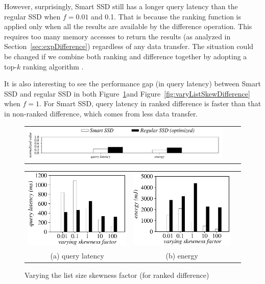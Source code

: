 However, surprisingly, Smart SSD still has a longer query latency than the regular SSD when $f=0.01$ and 0.1.
That is because the ranking function is applied only when all the results are available by the \textsf{difference} operation.
This requires too many memory accesses to return the results (as analyzed in Section~\ref{sec:expDifference}) regardless of any data transfer. The situation could be changed if we combine both ranking and difference together by adopting a top-$k$ ranking algorithm \cite{Fagin2001, Broder2003EQE}.

It is also interesting to see the performance gap (in query latency) between Smart SSD and regular SSD in both Figure~\ref{fig:varyListSkewRankDifference}and Figure~\ref{fig:varyListSkewDifference} when $f=1$. For Smart SSD, query latency in ranked difference is faster than that in non-ranked difference, which comes from less data transfer.

\begin{figure}[tbp]
  \centering
    \begin{tabular}{ccc}
 \includegraphics[width=0.52\columnwidth]{figures/banner2.pdf}%
\end{tabular}
\vspace{-0.1cm}
\renewcommand{\tabcolsep}{0.1mm}


  \begin{tabular}{ccc}
 \includegraphics[width=0.5\columnwidth]{figures/RankDifference-time-VaryListSkew.eps}&
  \includegraphics[width=0.5\columnwidth]{figures/RankDifference-energy-VaryListSkew.eps}\\
  (a) query latency & (b) energy
\end{tabular}

  \caption{Varying the list size skewness factor (for ranked difference)}
  \label{fig:varyListSkewRankDifference}
 \end{figure}

